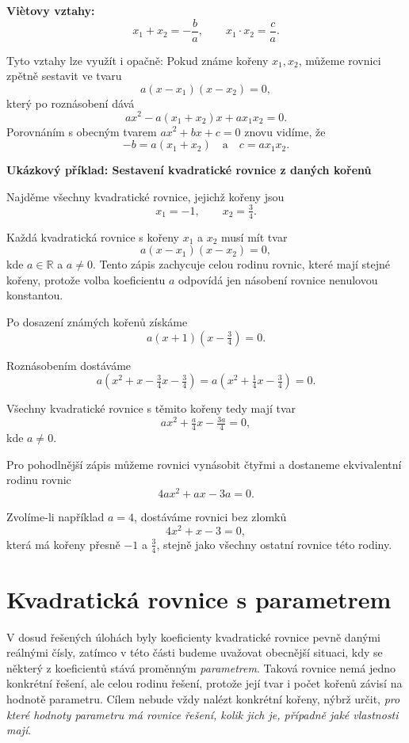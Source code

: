 \documentclass[12pt,a4paper]{article}
\begin{document}
\begin{definitionbox}
\textbf{Viètovy vztahy:}
\[
x_1 + x_2 = -\frac{b}{a}, \qquad x_1 \cdot x_2 = \frac{c}{a}.
\]
\end{definitionbox}

\medskip
Tyto vztahy lze využít i opačně:  
Pokud známe kořeny \(x_1, x_2\), můžeme rovnici zpětně sestavit ve tvaru
\[
a(x - x_1)(x - x_2) = 0,
\]
který po roznásobení dává
\[
ax^2 - a(x_1 + x_2)x + a x_1 x_2 = 0.
\]
Porovnáním s obecným tvarem \(ax^2 + bx + c = 0\) znovu vidíme, že
\[
-b = a(x_1 + x_2) \quad \text{a} \quad c = a x_1 x_2.
\]

\begin{examplebox}
\textbf{Ukázkový příklad: Sestavení kvadratické rovnice z daných kořenů}

Najděme všechny kvadratické rovnice, jejichž kořeny jsou 
\[
x_1 = -1, \qquad x_2 = \tfrac{3}{4}.
\]

Každá kvadratická rovnice s kořeny \(x_1\) a \(x_2\) musí mít tvar
\[
a(x - x_1)(x - x_2) = 0,
\]
kde \(a \in \mathbb{R}\) a \(a \neq 0\).  
Tento zápis zachycuje celou rodinu rovnic, které mají stejné kořeny, protože volba koeficientu \(a\) odpovídá jen násobení rovnice nenulovou konstantou.

Po dosazení známých kořenů získáme
\[
a(x + 1)\left(x - \tfrac{3}{4}\right) = 0.
\]

Roznásobením dostáváme
\[
a\left(x^2 + x - \tfrac{3}{4}x - \tfrac{3}{4}\right)
=
a\left(x^2 + \tfrac{1}{4}x - \tfrac{3}{4}\right)
= 0.
\]

Všechny kvadratické rovnice s těmito kořeny tedy mají tvar
\[
ax^2 + \tfrac{a}{4}x - \tfrac{3a}{4} = 0,
\]
kde \(a\neq 0\).

Pro pohodlnější zápis můžeme rovnici vynásobit čtyřmi a dostaneme ekvivalentní rodinu rovnic
\[
4ax^2 + ax - 3a = 0.
\]

Zvolíme-li například \(a = 4\), dostáváme rovnici bez zlomků
\[
4x^2 + x - 3 = 0,
\]
která má kořeny přesně \(-1\) a \(\tfrac{3}{4}\), stejně jako všechny ostatní rovnice této rodiny.

\end{examplebox}




\section{Kvadratická rovnice s parametrem}

V dosud řešených úlohách byly koeficienty kvadratické rovnice pevně danými reálnými čísly, 
zatímco v této části budeme uvažovat obecnější situaci, kdy se některý z koeficientů 
stává proměnným \textit{parametrem}.  
Taková rovnice nemá jedno konkrétní řešení, ale celou rodinu řešení, 
protože její tvar i počet kořenů závisí na hodnotě parametru.  
Cílem nebude vždy nalézt konkrétní kořeny, nýbrž určit, 
\textit{pro které hodnoty parametru má rovnice řešení, kolik jich je, případně jaké vlastnosti mají}.  
\end{document}
